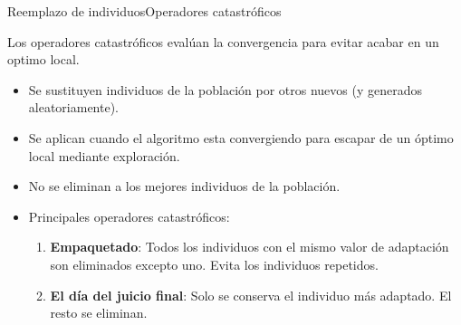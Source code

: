 \documentclass[10pt]{beamer}
\begin{document}
\begin{frame}{Reemplazo de individuos}{Operadores catastróficos}

Los operadores catastróficos evalúan la convergencia para evitar acabar en un optimo local.

	\begin{itemize}
		\item Se sustituyen individuos de la población por otros nuevos (y generados aleatoriamente).
		\item Se aplican cuando el algoritmo esta convergiendo para escapar de un óptimo local mediante exploración.
		\item No se eliminan a los mejores individuos de la población.
		\item Principales operadores catastróficos:
			\begin{enumerate}
				\item \textbf{Empaquetado}: Todos los individuos con el mismo valor de adaptación son eliminados excepto uno. Evita los individuos repetidos.
				\item \textbf{El día del juicio final}: Solo se conserva el individuo más adaptado. El resto se eliminan.
			\end{enumerate}
		
	\end{itemize}
\end{frame}


{\aauwavesbg
	\begin{frame}
	\end{frame}}
\end{document}
